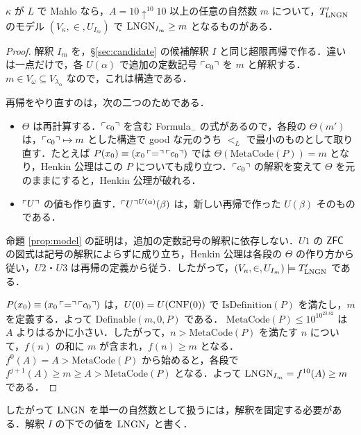 \begin{proposition}[解釈全体にわたる非有界性]\label{prop:unbounded}
$\kappa$ が $L$ で Mahlo なら，$A=10\uparrow^{10}10$ 以上の任意の自然数 $m$ について，$T'_{\mathrm{LNGN}}$ のモデル $(V_\kappa,\in,U_{I_m})$ で $\mathrm{LNGN}_{I_m}\ge m$ となるものがある．
\end{proposition}
\begin{proof}
解釈 $I_m$ を，\S\ref{sec:candidate} の候補解釈 $I$ と同じ超限再帰で作る．違いは一点だけで，各 $U(\alpha)$ で追加の定数記号 $\ulcorner c_0\urcorner$ を $m$ と解釈する．$m\in V_\omega\subseteq V_{\lambda_\alpha}$ なので，これは構造である．

再帰をやり直すのは，次の二つのためである．
\begin{itemize}
\item $\Theta$ は再計算する．$\ulcorner c_0\urcorner$ を含む Formula$_-$ の式があるので，各段の $\Theta(m')$ は，$\ulcorner c_0\urcorner\mapsto m$ とした構造で good な元のうち $<_L$ で最小のものとして取り直す．たとえば $P(x_0)\equiv(x_0\,\ulcorner =\urcorner\,\ulcorner c_0\urcorner)$ では $\Theta(\mathrm{MetaCode}(P))=m$ となり，Henkin 公理はこの $P$ についても成り立つ．$\ulcorner c_0\urcorner$ の解釈を変えて $\Theta$ を元のままにすると，Henkin 公理が破れる．
\item $\ulcorner U\urcorner$ の値も作り直す．$\ulcorner U\urcorner^{U(\alpha)}(\beta)$ は，新しい再帰で作った $U(\beta)$ そのものである．
\end{itemize}
命題 \ref{prop:model} の証明は，追加の定数記号の解釈に依存しない．$U1$ の $\mathsf{ZFC}$ の図式は記号の解釈によらずに成り立ち，Henkin 公理は各段の $\Theta$ の作り方から従い，$U2$・$U3$ は再帰の定義から従う．したがって，$(V_\kappa,\in,U_{I_m})\models T'_{\mathrm{LNGN}}$ である．

$P(x_0)\equiv(x_0\,\ulcorner =\urcorner\,\ulcorner c_0\urcorner)$ は，$U(0)=U(\mathrm{CNF}(0))$ で $\mathrm{IsDefinition}(P)$ を満たし，$m$ を定義する．よって $\mathrm{Definable}(m,0,P)$ である．
$\mathrm{MetaCode}(P)\le 10^{10^{23.82}}$ は $A$ よりはるかに小さい．したがって，$n>\mathrm{MetaCode}(P)$ を満たす $n$ について，$f(n)$ の和に $m$ が含まれ，$f(n)\ge m$ となる．
$f^0(A)=A>\mathrm{MetaCode}(P)$ から始めると，各段で $f^{j+1}(A)\ge m\ge A>\mathrm{MetaCode}(P)$ となる．よって $\mathrm{LNGN}_{I_m}=f^{10}(A)\ge m$ である．
\end{proof}

したがって $\mathrm{LNGN}$ を単一の自然数として扱うには，解釈を固定する必要がある．解釈 $I$ の下での値を $\mathrm{LNGN}_I$ と書く．

